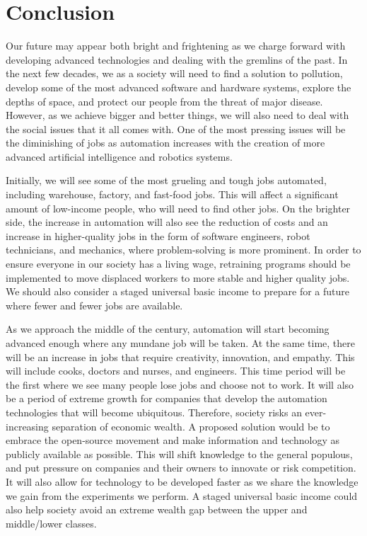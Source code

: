 \section{Conclusion}
\label{sec:conclusion}

Our future may appear both bright and frightening as we charge forward with developing advanced technologies and dealing with the gremlins of the past. In the next few decades, we as a society will need to find a solution to pollution, develop some of the most advanced software and hardware systems, explore the depths of space, and protect our people from the threat of major disease. However, as we achieve bigger and better things, we will also need to deal with the social issues that it all comes with. One of the most pressing issues will be the diminishing of jobs as automation increases with the creation of more advanced artificial intelligence and robotics systems.

Initially, we will see some of the most grueling and tough jobs automated, including warehouse, factory, and fast-food jobs. This will affect a significant amount of low-income people, who will need to find other jobs. On the brighter side, the increase in automation will also see the reduction of costs and an increase in higher-quality jobs in the form of software engineers, robot technicians, and mechanics, where problem-solving is more prominent. In order to ensure everyone in our society has a living wage, retraining programs should be implemented to move displaced workers to more stable and higher quality jobs. We should also consider a staged universal basic income to prepare for a future where fewer and fewer jobs are available.

As we approach the middle of the century, automation will start becoming advanced enough where any mundane job will be taken. At the same time, there will be an increase in jobs that require creativity, innovation, and empathy. This will include cooks, doctors and nurses, and engineers. This time period will be the first where we see many people lose jobs and choose not to work. It will also be a period of extreme growth for companies that develop the automation technologies that will become ubiquitous. Therefore, society risks an ever-increasing separation of economic wealth. A proposed solution would be to embrace the open-source movement and make information and technology as publicly available as possible. This will shift knowledge to the general populous, and put pressure on companies and their owners to innovate or risk competition. It will also allow for technology to be developed faster as we share the knowledge we gain from the experiments we perform. A staged universal basic income could also help society avoid an extreme wealth gap between the upper and middle/lower classes.

